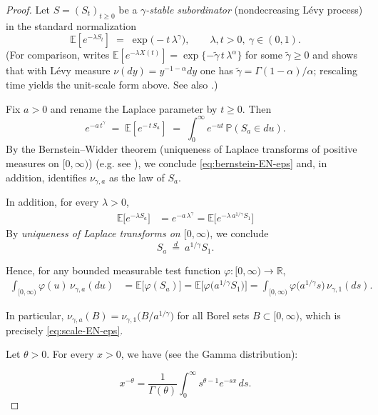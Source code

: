 \documentclass[preprint]{imsart}
\newcommand{\1}{\mathbf{1}}
\theoremstyle{plain}
\theoremstyle{definition}
\begin{document}
\begin{proof}

Let $S=(S_t)_{t\ge 0}$ be a \emph{$\gamma$-stable subordinator} (nondecreasing Lévy process) in the standard normalization
\[
\mathbb{E}\!\left[e^{-\lambda S_t}\right] \;=\; \exp\!\big(-t\,\lambda^{\gamma}\big), \qquad \lambda,t>0,\ \gamma\in(0,1).
\]
(For comparison, \cite{LalleySubordinators} writes $\mathbb{E}[e^{-\lambda X(t)}]=\exp\{-\tilde\gamma\,t\,\lambda^{\alpha}\}$ for some $\tilde\gamma\ge0$ and shows that with Lévy measure $\nu(dy)=y^{-1-\alpha}dy$ one has $\tilde\gamma=\Gamma(1-\alpha)/\alpha$; rescaling time yields the unit-scale form above. See also \cite[Chs.~1,\,3,\,5]{SSV12}.)

Fix $a>0$ and rename the Laplace parameter by $t\ge0$. Then
\[
e^{-a\,t^{\gamma}}
\;=\;
\mathbb{E}\!\left[e^{-\,t\,S_a}\right]
\;=\;
\int_{0}^{\infty} e^{-u t}\,\mathbb{P}(S_a\in du).
\]
By the Bernstein–Widder theorem (uniqueness of Laplace transforms of positive measures on $[0,\infty)$) (e.g. see \cite[Thm.~1.4]{SSV12}), we conclude \eqref{eq:bernstein-EN-eps} and, in addition, identifies $\nu_{\gamma,a}$ as the law of $S_a$.





In addition, for every \(\lambda>0\),
\begin{align*}
\mathbb{E}\big[e^{-\lambda S_a}\big]
&=e^{-a\,\lambda^\gamma}=\mathbb{E}\big[e^{-\lambda\,a^{1/\gamma}S_1}\big]
\end{align*}
By \emph{uniqueness of Laplace transforms on \([0,\infty)\)}, we conclude
\[
S_a\ \overset{d}{=}\ a^{1/\gamma} S_1.
\]

Hence, for any bounded measurable test function \(\varphi:[0,\infty)\to\mathbb{R}\),
\begin{align*}
\int_{[0,\infty)} \varphi(u)\,\nu_{\gamma,a}(du)
&=\mathbb{E}\big[\varphi(S_a)\big]
=\mathbb{E}\big[\varphi\!\big(a^{1/\gamma}S_1\big)\big]
=\int_{[0,\infty)} \varphi\!\big(a^{1/\gamma}s\big)\,\nu_{\gamma,1}(ds).
\end{align*}

In particular, \(\nu_{\gamma,a}(B)=\nu_{\gamma,1}\!\big(B/a^{1/\gamma}\big)\) for all Borel sets \(B\subset[0,\infty)\), which is precisely \eqref{eq:scale-EN-eps}.


Let \(\theta>0\). For every \(x>0\), we have (see the Gamma distribution):

\[
x^{-\theta}=\frac{1}{\Gamma(\theta)}\int_{0}^{\infty} s^{\theta-1} e^{-s x}\,ds.
\]



\end{proof}
\end{document}
